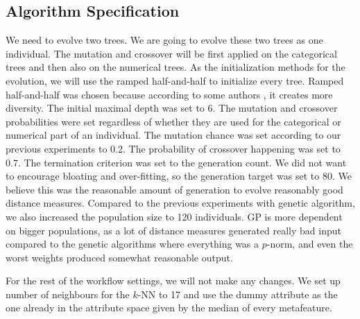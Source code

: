  \subsection{Algorithm Specification}
 We need to evolve two trees. We are going to evolve these two trees as one individual. The mutation and crossover will be first applied on the categorical trees and then also on the numerical trees. As the initialization methods for the evolution, we will use the ramped half-and-half to initialize every tree. Ramped half-and-half was chosen because according to some authors \cite{FieldGuideToGeneticProgramming}, it creates more diversity. The initial maximal depth was set to 6. The mutation and crossover probabilities were set regardless of whether they are used for the categorical or numerical part of an individual. The mutation chance was set according to our previous experiments to 0.2. The probability of crossover happening was set to 0.7. The termination criterion was set to the generation count. We did not want to encourage bloating and over-fitting, so the generation target was set to 80. We believe this was the reasonable amount of generation to evolve reasonably good distance measures. Compared to the previous experiments with genetic algorithm, we also increased the population size to 120 individuals. GP is more dependent on bigger populations, as a lot of distance measures generated really bad input compared to the genetic algorithms where everything was a $p$-norm, and even the worst weights produced somewhat reasonable output.
 
 For the rest of the workflow settings, we will not make any changes. We set up number of neighbours for the $k$-NN to 17 and use the dummy attribute as the one already in the attribute space given by the median of every metafeature.
 
